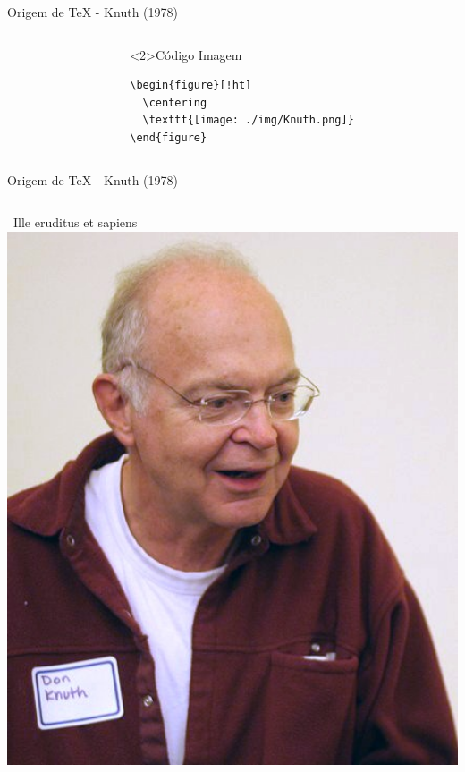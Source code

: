 \documentclass[bigger]{beamer}
\begin{document}
{\begin{frame}[label={sec:org5c6695b},fragile]{Origem de \TeX{} - Knuth (1978)}
\begin{columns}
\begin{column}{0.48\columnwidth}
\begin{block}
\end{block}
\end{column}
\begin{column}{0.48\columnwidth}
\begin{block}<2>{Código Imagem}
\begin{verbatim}
\begin{figure}[!ht]
  \centering
  \texttt{[image: ./img/Knuth.png]}
\end{figure}
\end{verbatim}
\end{block}
\end{column}
\end{columns}
\end{frame}

\begin{frame}[label={sec:orgd1f8b5d}]{Origem de \TeX{} - Knuth (1978)}
\begin{columns}
\begin{column}{0.48\columnwidth}
\begin{block}{\small{~Ille eruditus et sapiens~}}
\href{img/KnuthAtOpenContentAlliance.jpg}{\includegraphics[width=1.02\textwidth]{./img/KnuthAtOpenContentAlliance.jpg}}
\end{block}
\end{column}


\end{columns}
\end{frame}}
\end{document}
